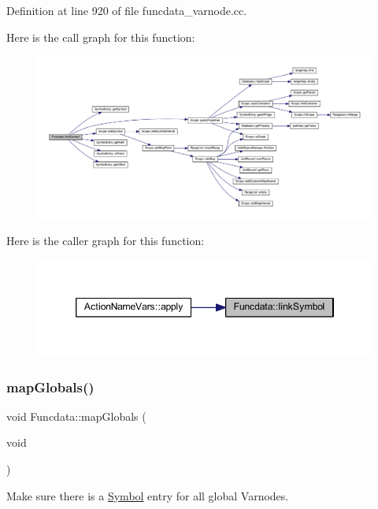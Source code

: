 Definition at line 920 of file funcdata\+\_\+varnode.\+cc.

Here is the call graph for this function\+:
\nopagebreak
\begin{figure}[H]
\begin{center}
\leavevmode
\includegraphics[width=350pt]{class_funcdata_afbb3bc5ac9e2c09eda544db34b8f5879_cgraph}
\end{center}
\end{figure}
Here is the caller graph for this function\+:
\nopagebreak
\begin{figure}[H]
\begin{center}
\leavevmode
\includegraphics[width=346pt]{class_funcdata_afbb3bc5ac9e2c09eda544db34b8f5879_icgraph}
\end{center}
\end{figure}
\mbox{\label{class_funcdata_aed6aefa7321e887e3b759de94e4d3d4f}} 
\subsubsection{\texorpdfstring{mapGlobals()}{mapGlobals()}}
{\footnotesize\ttfamily void Funcdata\+::map\+Globals (\begin{DoxyParamCaption}\item[{void}]{ }\end{DoxyParamCaption})}



Make sure there is a \mbox{\hyperlink{class_symbol}{Symbol}} entry for all global Varnodes. 

